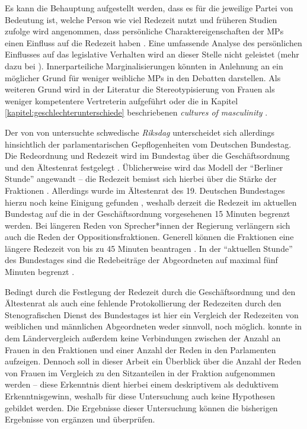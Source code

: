 \documentclass[12pt, 
    twoside=false, 
    bibliography=totoc, 
    numbers=endperiod, 
    headings=normal, 
    toc=chapterentrydotfill
    ]{scrbook}
\begin{document}
Es kann die Behauptung aufgestellt werden, dass es für die jeweilige Partei von Bedeutung ist, welche Person wie viel Redezeit nutzt \parencite[vgl.][]{proksch_2012} und früheren Studien zufolge wird angenommen, dass persönliche Charaktereigenschaften der MPs einen Einfluss auf die Redezeit haben \parencite[505]{back_2014}. Eine umfassende Analyse des persönlichen Einflusses auf das legislative Verhalten wird an dieser Stelle nicht geleistet (mehr dazu bei \textcite{saalfeld_2011}). Innerparteiliche Marginalisierungen könnten in Anlehnung an \textcite[507]{back_2014} ein möglicher Grund für weniger weibliche MPs in den Debatten darstellen. Als weiteren Grund wird in der Literatur die Stereotypisierung von Frauen als weniger kompetentere Vertreterin aufgeführt oder die in Kapitel \ref{kapitel:geschlechterunterschiede} beschriebenen \emph{cultures of masculinity} \parencites[507]{back_2014}{lovenduski_2005}. 

Der von von \textcite{back_2014} untersuchte schwedische \emph{Riksdag} unterscheidet sich allerdings hinsichtlich der parlamentarischen Gepflogenheiten vom Deutschen Bundestag. Die Redeordnung und Redezeit wird im Bundestag über die Geschäftsordnung und den Ältestenrat festgelegt \parencite[64f.]{linn_2018}. Üblicherweise wird das Modell der \enquote{Berliner Stunde} angewandt -- die Redezeit bemisst sich hierbei über die Stärke der Fraktionen \parencite[vgl.][]{schreiner_2005}. Allerdings wurde im Ältestenrat des 19. Deutschen Bundestages hierzu noch keine Einigung gefunden \parencite[64]{linn_2018}, weshalb derzeit die Redezeit im aktuellen Bundestag auf die in der Geschäftsordnung vorgesehenen 15 Minuten begrenzt werden. Bei längeren Reden von Sprecher*innen der Regierung verlängern sich auch die Reden der Oppositionsfraktionen. Generell können die Fraktionen eine längere Redezeit von bis zu 45 Minuten beantragen \parencite{bundestag_2019}. In der \enquote{aktuellen Stunde} des Bundestages sind die Redebeiträge der Abgeordneten auf maximal fünf Minuten begrenzt \parencites[68]{linn_2018}[]{bundestag_2019}.

Bedingt durch die Festlegung der Redezeit durch die Geschäftsordnung und den Ältestenrat als auch eine fehlende Protokollierung der Redezeiten durch den Stenografischen Dienst des Bundestages ist hier ein Vergleich der Redezeiten von weiblichen und männlichen Abgeordneten weder sinnvoll, noch möglich.
\textcite{back_2018} konnte in dem Ländervergleich außerdem keine Verbindungen zwischen der Anzahl an Frauen in den Fraktionen und einer Anzahl der Reden in den Parlamenten aufzeigen. Dennoch soll in dieser Arbeit ein Überblick über die Anzahl der Reden von Frauen im Vergleich zu den Sitzanteilen in der Fraktion aufgenommen werden -- diese Erkenntnis dient hierbei einem deskriptivem als deduktivem Erkenntnisgewinn, weshalb für diese Untersuchung auch keine Hypothesen gebildet werden. Die Ergebnisse dieser Untersuchung können die bisherigen Ergebnisse von \textcite{back_2018} ergänzen und überprüfen.
\end{document}
